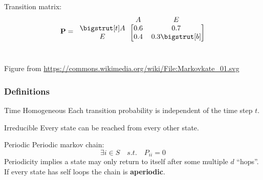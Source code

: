 \documentclass{beamer}
\begin{document}
\begin{frame}
\begin{block}{}
\begin{columns}
\begin{column}{0.5\linewidth}
\centering
Transition matrix:
\[{\bf P} =
\begin{blockarray}{ccc}
  & A & E \\
	\begin{block}{c[cc]}
		\bigstrut[t]
		A & 0.6 & 0.7 \\
		E & 0.4 & 0.3
		\bigstrut[b] \\
	\end{block}
\end{blockarray}
\]
\end{column}
\end{columns}

\begin{center}
\begin{tiny}
Figure from \url{https://commons.wikimedia.org/wiki/File:Markovkate_01.svg}
\end{tiny}
\end{center}
\end{block}

\end{frame}


\begin{frame}
\frametitle{Definitions}
\begin{block}{Time Homogeneous}
Each transition probability is independent of the time step $t$.
\end{block}

\begin{block}{Irreducible}
Every state can be reached from every other state.
\end{block}

\begin{block}{Periodic}
Periodic markov chain:
\[ \exists i \in S \quad s.t. \quad P_{ii} = 0\]
Periodicity implies a state may only return to itself after some multiple $d$ ``hops''.  If every state has self loops the chain is \textbf{aperiodic}.
\end{block}

\end{frame}
\end{document}
